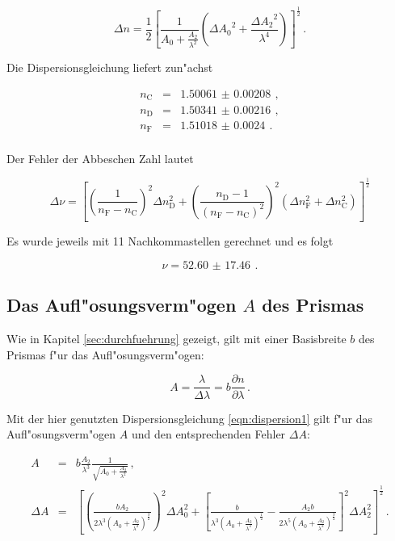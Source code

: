 		\begin{equation*}
			\Delta n = \frac{1}{2}\left[\frac{1}{A_0 + \frac{A_2}{\lambda^2}}\left(\Delta {A_0}^2 + \frac{\Delta {A_2}^2}{\lambda^4}\right)\right]^\frac{1}{2}\,.
		\end{equation*}

		Die Dispersionsgleichung liefert zun"achst

		\begin{eqnarray*}
			n_\mathrm{C} & = & \SI{1.50061(208)}{} \,, \\
			n_\mathrm{D} & = & \SI{1.50341(216)}{} \,, \\
			n_\mathrm{F} & = & \SI{1.51018(240)}{} \,. \\
		\end{eqnarray*}

		Der Fehler der Abbeschen Zahl lautet

		\begin{equation*}
			\Delta \nu = \left[\left(\frac{1}{n_\mathrm{F}-n_\mathrm{C}}\right)^2 \Delta n_\mathrm{D}^2 + \left(\frac{n_\mathrm{D}-1}{(n_\mathrm{F}-n_\mathrm{C})^2}\right)^2\left(\Delta n_\mathrm{F}^2 + \Delta n_\mathrm{C}^2\right) \right]^\frac{1}{2}
		\end{equation*}

		Es wurde jeweils mit 11 Nachkommastellen gerechnet und es folgt

		\begin{equation*}
			\nu = \SI{52.60(1746)}{} \,.
		\end{equation*}

	\subsection{Das Aufl"osungsverm"ogen $A$ des Prismas}
	\label{subsec:aufloesungsvermoegen}
		Wie in Kapitel \ref{sec:durchfuehrung} gezeigt, gilt mit einer Basisbreite $b$ des Prismas f"ur das Aufl"osungsverm"ogen:

		\begin{equation*}
			A = \frac{\lambda}{\Delta \lambda} = b \frac{\partial n}{\partial \lambda} \,.
		\end{equation*}

		Mit der hier genutzten Dispersionsgleichung \eqref{eqn:dispersion1} gilt f"ur das Aufl"osungsverm"ogen $A$ und den entsprechenden Fehler $\Delta A$:

		\begin{eqnarray*}
			A & = & b \frac{A_2}{\lambda^3} \frac{1}{\sqrt{A_0 + \frac{A_2}{\lambda^2}}} \,, \\
			\Delta A & = & \left[\left(\frac{b A_2}{2 \lambda^3 \left( A_0 + \frac{A_2}{\lambda^2} \right)^\frac{3}{2}} \right)^2 \Delta A_0^2 + 
				\left[\frac{b}{\lambda^3 \left(A_0 + \frac{A_2}{\lambda^2}\right)^\frac{1}{2}} - \frac{A_2 b}{2\lambda^5 \left(A_0 + \frac{A_2}{\lambda^2}\right)^\frac{3}{2}}\right]^2 \Delta A_2^2
			\right]^\frac{1}{2} \,.
		\end{eqnarray*}

